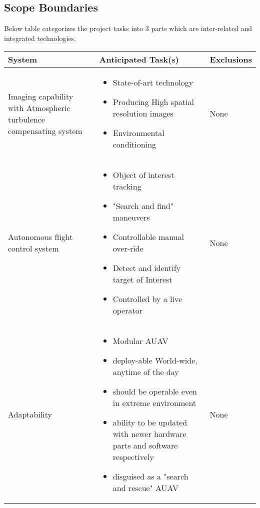 \begin{fullwidth}
\subsection{Scope Boundaries}
Below table categorizes the project tasks into 3 parts which are inter-related and integrated technologies.
\begin{table}
\centering
    \begin{tabular}{|p{5cm}| p{7cm}| p{2cm}|}
         \hline
          \rowcolor[gray]{0.8}
         System & Anticipated Task(s) & Exclusions\\[1ex]
         \hline
         Imaging capability with Atmospheric turbulence compensating system& \begin{itemize}
             \item {State-of-art technology}
             \item{Producing High spatial resolution images}
             \item{Environmental conditioning}
         \end{itemize}
         & None\\
        \hline
        Autonomous flight control system &
        \begin{itemize}
            \item{Object of interest tracking}
            \item{"Search and find" maneuvers}
            \item{Controllable manual over-ride}
            \item{Detect and identify target of Interest}
            \item{Controlled by a live operator}
        \end{itemize}
        & None\\
        \hline
        Adaptability&
        \begin{itemize}
            \item {Modular AUAV}
            \item{deploy-able World-wide, anytime of the day}
            \item{should be operable  even in extreme environment}
            \item{ability to be updated with newer hardware parts and software respectively}
            \item{disguised as a "search and rescue" AUAV}
        \end{itemize}
        & None\\
        \hline
    \end{tabular}
\end{table}
\end{fullwidth}
